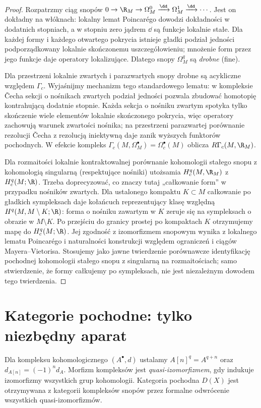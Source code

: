 \begin{proof}
Rozpatrzmy ciąg snopów
$0\to\R_M\to\Omega_M^0\xrightarrow{\dd}\Omega_M^1
\xrightarrow{\dd}\cdots$. Jest on dokładny na włóknach:
lokalny lemat Poincarégo dowodzi dokładności w dodatnich
stopniach, a w stopniu zero jądrem $\dd$ są funkcje lokalnie
stałe. Dla każdej formy i każdego otwartego pokrycia
istnieje gładki podział jedności podporządkowany
lokalnie skończonemu uszczegółowieniu; mnożenie form
przez jego funkcje daje operatory lokalizujące.
Dlatego snopy $\Omega_M^q$ są \emph{drobne} (fine).

Dla przestrzeni lokalnie zwartych i parazwartych snopy
drobne są acykliczne względem $\Gamma_c$. Wyjaśnijmy
mechanizm tego standardowego lematu: w kompleksie
\v{C}echa sekcji o nośnikach zwartych podział jedności
pozwala zbudować homotopię kontrahującą dodatnie
stopnie. Każda sekcja o nośniku zwartym spotyka tylko
skończenie wiele elementów lokalnie skończonego pokrycia,
więc operatory zachowują warunek zwartości nośnika;
na przestrzeni parazwartej porównanie rezolucji
\v{C}echa z rezolucją iniektywną daje zanik wyższych
funktorów pochodnych. W efekcie kompleks
$\Gamma_c(M,\Omega_M^\bullet)=\Omega_c^\bullet(M)$
oblicza $R\Gamma_c(M,\R_M)$.

Dla rozmaitości lokalnie kontraktowalnej porównanie
kohomologii stałego snopu z kohomologią singularną
(respektujące nośniki) utożsamia
$H_c^q(M,\R_M)$ z $H_c^q(M;\R)$.
Trzeba doprecyzować, co znaczy tutaj „całkowanie form”
w przypadku nośników zwartych. Dla ustalonego kompaktu
$K\subset M$ całkowanie po gładkich sympleksach daje
kołańcuch reprezentujący klasę względną
$H^q(M,M\setminus K;\R)$: forma o nośniku zawartym
w $K$ zeruje się na sympleksach o obrazie w $M\setminus K$.
Po przejściu do granicy prostej po kompaktach $K$
otrzymujemy mapę do $H_c^q(M;\R)$.
Jej zgodność z izomorfizmem snopowym wynika z lokalnego
lematu Poincarégo i naturalności konstrukcji względem
ograniczeń i ciągów Mayera--Vietorisa.
Stosujemy jako jawne twierdzenie porównawcze
identyfikację pochodnej kohomologii stałego snopu
z singularną na rozmaitościach; samo stwierdzenie,
że formy całkujemy po sympleksach, nie jest niezależnym
dowodem tego twierdzenia.
\end{proof}

\section{Kategorie pochodne: tylko niezbędny aparat}
\begin{definicja}
Dla kompleksu kohomologicznego $(A^\bullet,d)$ ustalamy
$A[n]^q=A^{q+n}$ oraz $d_{A[n]}=(-1)^n d_A$.
Morfizm kompleksów jest \emph{quasi-izomorfizmem}, gdy
indukuje izomorfizmy wszystkich grup kohomologii.
Kategoria pochodna $D(X)$ jest otrzymywana z kategorii
kompleksów snopów przez formalne odwrócenie wszystkich
quasi-izomorfizmów.
\end{definicja}

